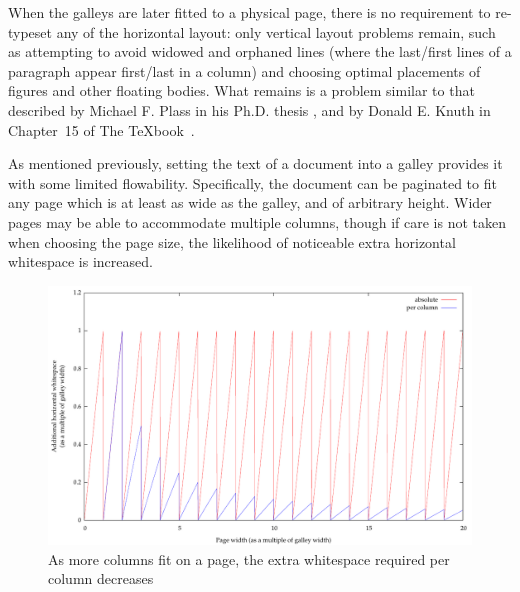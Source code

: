 When the galleys are later fitted to a physical page, there is no requirement to re-typeset any of the horizontal layout: only vertical layout problems remain, such as attempting to avoid widowed and orphaned lines (where the last/first lines of a paragraph appear first/last in a column) and choosing optimal placements of figures and other floating bodies. What remains is a problem similar to that described by Michael F. Plass in his Ph.D. thesis \cite{Plass1981}, and by Donald E. Knuth in Chapter~15 of The \TeX{}book~\cite{Knuth1984}.

As mentioned previously, setting the text of a document into a galley provides it with some limited flowability. Specifically, the document can be paginated to fit any page which is at least as wide as the galley, and of arbitrary height. Wider pages may be able to accommodate multiple columns, though if care is not taken when choosing the page size, the likelihood of noticeable extra horizontal whitespace is increased.


\begin{figure}
 \includegraphics[height=\textwidth,angle=90]{gnuplot/1col}
 \caption[Extra whitespace in a single-galley document]{As more columns fit on a page, the extra whitespace required per column decreases}
 \label{fig:sawtooth}
\end{figure}


